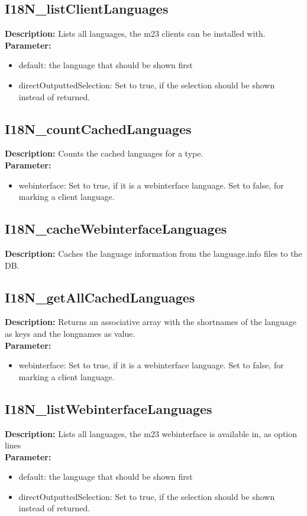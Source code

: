 \subsection{I18N\_listClientLanguages}
\textbf{Description:} Lists all languages, the m23 clients can be installed with.\\
\textbf{Parameter:}
\begin{itemize}
\item default: the language that should be shown first
\item directOutputtedSelection: Set to true, if the selection should be shown instead of returned.
\end{itemize}

\subsection{I18N\_countCachedLanguages}
\textbf{Description:} Counts the cached languages for a type.\\
\textbf{Parameter:}
\begin{itemize}
\item webinterface: Set to true, if it is a webinterface language. Set to false, for marking a client language.
\end{itemize}

\subsection{I18N\_cacheWebinterfaceLanguages}
\textbf{Description:} Caches the language information from the language.info files to the DB.\\

\subsection{I18N\_getAllCachedLanguages}
\textbf{Description:} Returns an associative array with the shortnames of the language as keys and the longnames as value.\\
\textbf{Parameter:}
\begin{itemize}
\item webinterface: Set to true, if it is a webinterface language. Set to false, for marking a client language.
\end{itemize}

\subsection{I18N\_listWebinterfaceLanguages}
\textbf{Description:} Lists all languages, the m23 webinterface is available in, as option lines\\
\textbf{Parameter:}
\begin{itemize}
\item default: the language that should be shown first
\item directOutputtedSelection: Set to true, if the selection should be shown instead of returned.
\end{itemize}

